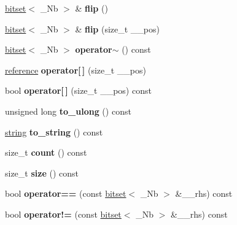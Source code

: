 \begin{DoxyCompactItemize}
\hyperlink{classbitset}{bitset}$<$ \+\_\+\+Nb $>$ \& {\bfseries flip} ()
\item 
\mbox{\label{classbitset_aba7bd38847381281a872da3940d8f06a}} 
\hyperlink{classbitset}{bitset}$<$ \+\_\+\+Nb $>$ \& {\bfseries flip} (size\+\_\+t \+\_\+\+\_\+pos)
\item 
\mbox{\label{classbitset_aefd509d11ba829097ca2af38bf30c777}} 
\hyperlink{classbitset}{bitset}$<$ \+\_\+\+Nb $>$ {\bfseries operator$\sim$} () const
\item 
\mbox{\label{classbitset_adf3ee652d9ed9fc609b9f13670832790}} 
\hyperlink{structbitset_1_1reference}{reference} {\bfseries operator\mbox{[}$\,$\mbox{]}} (size\+\_\+t \+\_\+\+\_\+pos)
\item 
\mbox{\label{classbitset_aeacc5c6dc1de4a09ab66c57cf9d17f05}} 
bool {\bfseries operator\mbox{[}$\,$\mbox{]}} (size\+\_\+t \+\_\+\+\_\+pos) const
\item 
\mbox{\label{classbitset_a8b7a715b5353fbba7780630eed768ab0}} 
unsigned long {\bfseries to\+\_\+ulong} () const
\item 
\mbox{\label{classbitset_a1a050d5b18b8bd8fa83d3843bef5df03}} 
\hyperlink{structstring}{string} {\bfseries to\+\_\+string} () const
\item 
\mbox{\label{classbitset_ada7fb938beaf6f30f216162106f3d41e}} 
size\+\_\+t {\bfseries count} () const
\item 
\mbox{\label{classbitset_a2ab7440164996afefb74e033f1f51db6}} 
size\+\_\+t {\bfseries size} () const
\item 
\mbox{\label{classbitset_ad4fc5e71e389c1c021b5afce857b9eae}} 
bool {\bfseries operator==} (const \hyperlink{classbitset}{bitset}$<$ \+\_\+\+Nb $>$ \&\+\_\+\+\_\+rhs) const
\item 
\mbox{\label{classbitset_aad78fea0210ac744299acb77ee2fa513}} 
bool {\bfseries operator!=} (const \hyperlink{classbitset}{bitset}$<$ \+\_\+\+Nb $>$ \&\+\_\+\+\_\+rhs) const
\item 

\end{DoxyCompactItemize}
